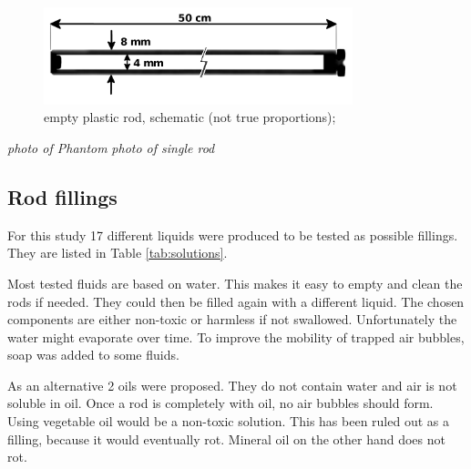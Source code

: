 \documentclass[parskip,bibtotoc,final,twoside=false,titlepage,a4paper,english,12pt,titlepage,a4paper]{scrbook}
\begin{document}
\begin{figure}[!tbp]
\centering
\includegraphics[width=0.8\textwidth]{slicer3D/full_phantom/rod_schematic.png}
\caption{empty plastic rod, schematic (not true proportions); }
\label{fig:rod_schematic}
\end{figure}

\vspace{4cm}
\textit{photo of Phantom}
\vspace{2cm}
\vspace{4cm}
\textit{photo of single rod}
\vspace{2cm}

\subsection{Rod fillings}

For this study 17 different liquids were produced to be tested as possible fillings. They are listed in Table \ref{tab:solutions}.

Most tested fluids are based on water. This makes it easy to empty and clean the rods if needed. They could then be filled again with a different liquid.
The chosen components are either non-toxic or harmless if not swallowed.
Unfortunately the water might evaporate over time. To improve the mobility of trapped air bubbles, soap was added to some fluids.

As an alternative 2 oils were proposed. They do not contain water and air is not soluble in oil. Once a rod is completely with oil, no air bubbles should form.
Using vegetable oil would be a non-toxic solution. This has been ruled out as a filling, because it would eventually rot.
Mineral oil on the other hand does not rot.
\end{document}
